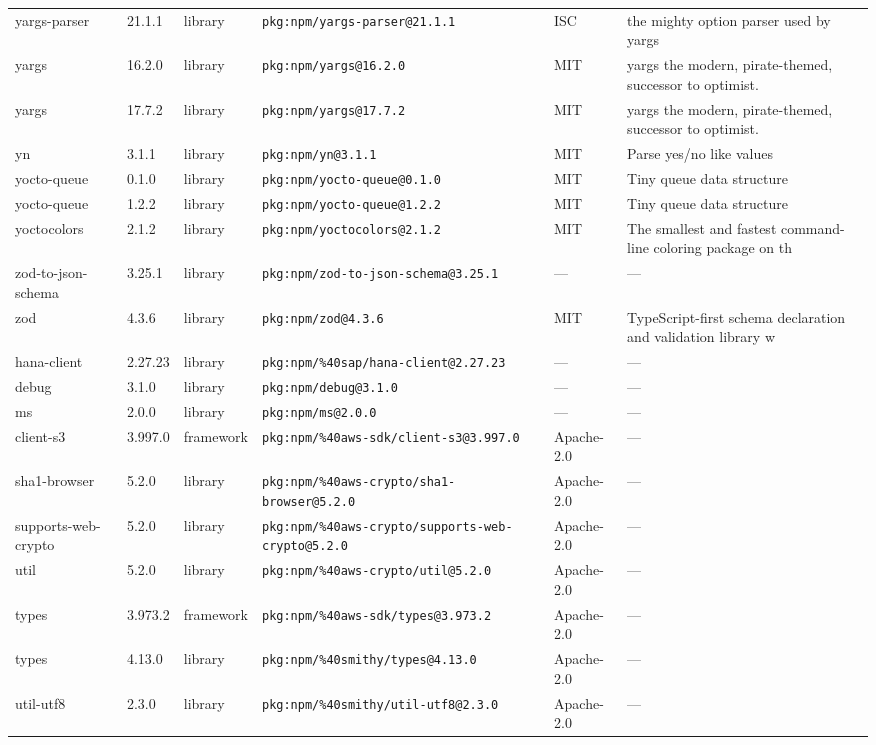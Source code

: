 \documentclass[11pt]{article}
\begin{document}
\begin{longtable}{|l|l|l|p{2.2cm}|l|p{4cm}|}
yargs-parser & 21.1.1 & library & \texttt{pkg:npm/yargs-parser@21.1.1} & ISC & the mighty option parser used by yargs \\
yargs & 16.2.0 & library & \texttt{pkg:npm/yargs@16.2.0} & MIT & yargs the modern, pirate-themed, successor to optimist. \\
yargs & 17.7.2 & library & \texttt{pkg:npm/yargs@17.7.2} & MIT & yargs the modern, pirate-themed, successor to optimist. \\
yn & 3.1.1 & library & \texttt{pkg:npm/yn@3.1.1} & MIT & Parse yes/no like values \\
yocto-queue & 0.1.0 & library & \texttt{pkg:npm/yocto-queue@0.1.0} & MIT & Tiny queue data structure \\
yocto-queue & 1.2.2 & library & \texttt{pkg:npm/yocto-queue@1.2.2} & MIT & Tiny queue data structure \\
yoctocolors & 2.1.2 & library & \texttt{pkg:npm/yoctocolors@2.1.2} & MIT & The smallest and fastest command-line coloring package on th \\
zod-to-json-schema & 3.25.1 & library & \texttt{pkg:npm/zod-to-json-schema@3.25.1} & — & — \\
zod & 4.3.6 & library & \texttt{pkg:npm/zod@4.3.6} & MIT & TypeScript-first schema declaration and validation library w \\
hana-client & 2.27.23 & library & \texttt{pkg:npm/\%40sap/hana-client@2.27.23} & — & — \\
debug & 3.1.0 & library & \texttt{pkg:npm/debug@3.1.0} & — & — \\
ms & 2.0.0 & library & \texttt{pkg:npm/ms@2.0.0} & — & — \\
client-s3 & 3.997.0 & framework & \texttt{pkg:npm/\%40aws-sdk/client-s3@3.997.0} & Apache-2.0 & — \\
sha1-browser & 5.2.0 & library & \texttt{pkg:npm/\%40aws-crypto/sha1-browser@5.2.0} & Apache-2.0 & — \\
supports-web-crypto & 5.2.0 & library & \texttt{pkg:npm/\%40aws-crypto/supports-web-crypto@5.2.0} & Apache-2.0 & — \\
util & 5.2.0 & library & \texttt{pkg:npm/\%40aws-crypto/util@5.2.0} & Apache-2.0 & — \\
types & 3.973.2 & framework & \texttt{pkg:npm/\%40aws-sdk/types@3.973.2} & Apache-2.0 & — \\
types & 4.13.0 & library & \texttt{pkg:npm/\%40smithy/types@4.13.0} & Apache-2.0 & — \\
util-utf8 & 2.3.0 & library & \texttt{pkg:npm/\%40smithy/util-utf8@2.3.0} & Apache-2.0 & — \\

\end{longtable}
\end{document}
